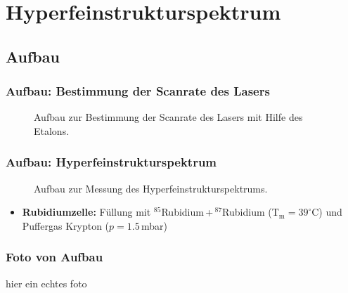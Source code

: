 
\section{Hyperfeinstrukturspektrum}
\subsection{Aufbau}


\begin{frame}
\frametitle{Aufbau: Bestimmung der Scanrate des Lasers}

\begin{figure}
    \centering
    \def\svgwidth{\textwidth}
    
    \caption{Aufbau zur Bestimmung der Scanrate des Lasers mit Hilfe des Etalons.}
\end{figure}



\end{frame}

\begin{frame}
\frametitle{Aufbau: Hyperfeinstrukturspektrum}

\begin{figure}
    \centering
    \def\svgwidth{\textwidth}
    
    \caption{Aufbau zur Messung des Hyperfeinstrukturspektrums.}
\end{figure}


\begin{itemize}
  \item \textbf{Rubidiumzelle:} Füllung mit $^{85}$\!Rubidium\,+\,$^{87}$\!Rubidium (T$_\text{m}=39^\circ$C)
  und Puffergas Krypton ($p=1.5$\,mbar)
   
\end{itemize}

\end{frame}



\begin{frame}
\frametitle{Foto von Aufbau}

hier ein echtes foto

\end{frame}



